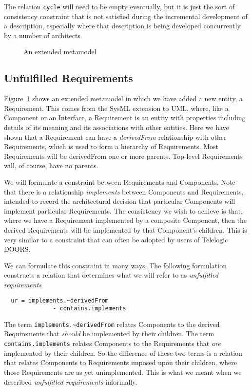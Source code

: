 \documentclass[a4paper,twoside]{article}
\begin{document}
The relation {\small\verb$cycle$} will need to be empty eventually, but it is just the sort of consistency constraint that is not satisfied during the incremental development of a description, especially where that description is being developed concurrently by a number of architects.
%
\begin{figure}[!h]
  \centering
   {}
  \caption{An extended metamodel}
  \label{fig:fig4}
\end{figure}
%


\subsection{Unfulfilled Requirements}

\noindent Figure~\ref{fig:fig4} shows an extended metamodel in which we have added a new entity, a Requirement. This comes from the SysML extension to UML, where, like a Component or an Interface, a Requirement is an entity with properties including details of its meaning and its associations with other entities. Here we have shown that a Requirement can have a {\em derivedFrom} relationship with other Requirements, which is used to form a hierarchy of Requirements. Most Requirements will be derivedFrom one or more parents. Top-level Requirements will, of course, have no parents. 

We will formulate a constraint between Requirements and Components. Note that there is a relationship {\em implements} between Components and Requirements, intended to record the architectural decision that particular Components will implement particular Requirements. The consistency we wish to achieve is that, where we have a Requirement implemented by a composite Component, then the derived Requirements will be implemented by that Component's children. This is very similar to a constraint that can often be adopted by users of Telelogic DOORS.

We can formulate this constraint in many ways. The following formulation constructs a relation that determines what we will refer to as {\em unfulfilled requirements}
\begin{small}
\begin{verbatim}
  ur = implements.~derivedFrom 
              - contains.implements
\end{verbatim}
\end{small}
The term {\small\verb$implements.~derivedFrom$} relates Components to the derived Requirements that {\em should} be implemented by their children. The term {\small\verb$contains.implements$} relates Components to the Requirements that {\em are} implemented by their children. So the difference of these two terms is a relation  that relates Components to Requirements imposed upon their children, where those Requirements are as yet unimplemented. This is what we meant when  we described {\em unfulfilled requirements} informally.
\end{document}
